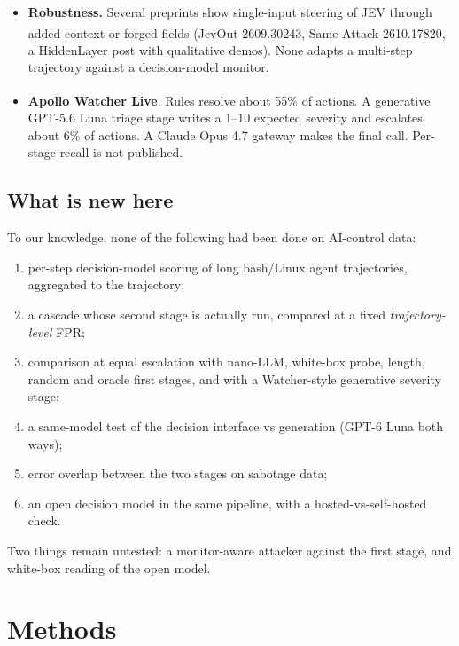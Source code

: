 \documentclass[11pt]{article}
\newcommand{\uv}{\textsuperscript{\dag}}
\begin{document}
\begin{itemize}
\begin{itemize}
  \item Our own white-box track (report 04) found that a probe-triage cascade gains $+0.12$ TPR at 1\% FPR while calling the LLM on 13\% of steps.
  \end{itemize}
\item \textbf{Robustness.} Several preprints show single-input steering of JEV through added context or forged fields (JevOut 2609.30243\uv, Same-Attack 2610.17820\uv, a HiddenLayer post with qualitative demos). None adapts a multi-step trajectory against a decision-model monitor.
\item \textbf{Apollo Watcher Live}\uv. Rules resolve about 55\% of actions. A generative GPT-5.6 Luna triage stage writes a 1--10 expected severity and escalates about 6\% of actions. A Claude Opus 4.7 gateway makes the final call. Per-stage recall is not published.
\end{itemize}

\subsection{What is new here}
To our knowledge, none of the following had been done on AI-control data:
\begin{enumerate}
\item per-step decision-model scoring of long bash/Linux agent trajectories, aggregated to the trajectory;
\item a cascade whose second stage is actually run, compared at a fixed \emph{trajectory-level} FPR;
\item comparison at equal escalation with nano-LLM, white-box probe, length, random and oracle first stages, and with a Watcher-style generative severity stage;
\item a same-model test of the decision interface vs generation (GPT-6 Luna both ways);
\item error overlap between the two stages on sabotage data;
\item an open decision model in the same pipeline, with a hosted-vs-self-hosted check.
\end{enumerate}
Two things remain untested: a monitor-aware attacker against the first stage, and white-box reading of the open model.

\section{Methods}\label{sec:methods}
\end{document}
